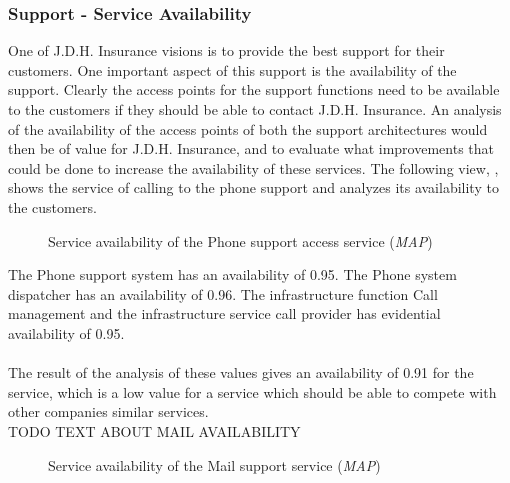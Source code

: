 \subsubsection{Support - Service Availability}
\label{sec:support_analysis}
One of J.D.H. Insurance visions is to provide the best support for their customers. One important aspect of this support is the availability of the support. Clearly the access points for the support functions need to be available to the customers if they should be able to contact J.D.H. Insurance. An analysis of the availability of the access points of both the support architectures would then be of value for J.D.H. Insurance, and to evaluate what improvements that could be done to increase the availability of these services. The following view, , shows the service of calling to the phone support and analyzes its availability to the customers.
\begin{center}
	\begin{figure}[H]
		\centering
		\setlength\fboxsep{7pt}
		\setlength\fboxrule{0.5pt}
		\caption{Service availability of the Phone support access service (\emph{MAP})}
		\label{fig:map_support_phone_availability}
	\end{figure}
\end{center}
The Phone support system has an availability of 0.95. The Phone system dispatcher has an availability of 0.96. The infrastructure function Call management and the infrastructure service call provider has evidential availability of 0.95.\\\\
%
The result of the analysis of these values gives an availability of 0.91 for the service, which is a low value for a service which should be able to compete with other companies similar services.
\\TODO TEXT ABOUT MAIL AVAILABILITY\\
\begin{center}
	\begin{figure}[H]
		\centering
		\setlength\fboxsep{7pt}
		\setlength\fboxrule{0.5pt}
		\caption{Service availability of the Mail support service (\emph{MAP})}
		\label{fig:map_support_mail_availability}
	\end{figure}
\end{center}

\vspace{-1cm}

%
